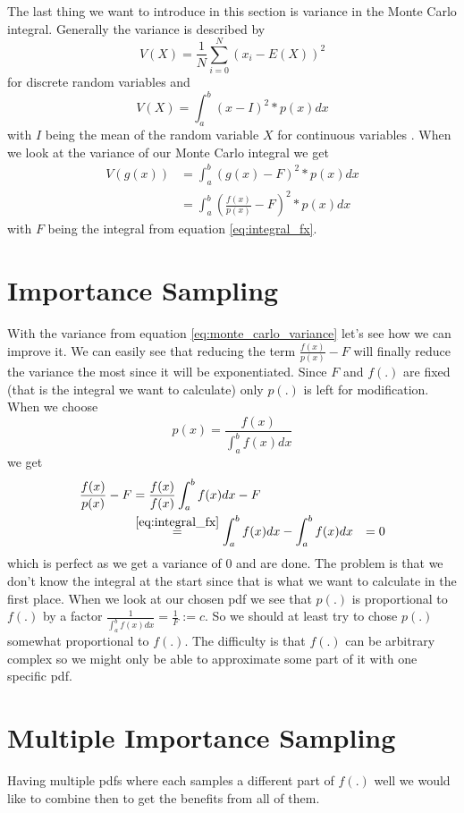 The last thing we want to introduce in this section is variance in the Monte Carlo integral.
Generally the variance is described by $$ V(X) = \frac{1}{N} \sum_{i = 0}^N (x_i - E(X))^2 $$ for discrete random variables \cite{pris}
and $$ V(X) = \int_{a}^b (x - I)^2 * p(x) dx $$ with $ I $ being the mean of the random variable $ X $ for continuous variables \cite{wyzant}.
When we look at the variance of our Monte Carlo integral we get
\begin{equation}
\label{eq:monte_carlo_variance}
\begin{aligned}
    V(g(x)) &= \int_{a}^b (g(x) - F)^2 * p(x) dx \\
            &= \int_{a}^b \left(\frac{f(x)}{p(x)} - F\right)^2 * p(x) dx
\end{aligned}
\end{equation}
with $ F $ being the integral from equation \ref{eq:integral_fx}.


\section{Importance Sampling}
\label{sec:importance_sampling}
With the variance from equation \ref{eq:monte_carlo_variance} let's see how we can improve it.
We can easily see that reducing the term $ \frac{f(x)}{p(x)} - F $ will finally reduce the variance the most since it will be exponentiated.
Since $ F $ and $ f(.) $ are fixed (that is the integral we want to calculate) only $ p(.) $ is left for modification.
When we choose $$ p(x) = \frac{f(x)}{\int_{a}^b f(x) dx} $$ we get
\begin{equation*}
\begin{aligned}
    \frac{f(x)}{p(x)} - F &= \frac{f(x)}{f(x)}\int_{a}^b f(x) dx - F \\
        &\stackrel{\ref{eq:integral_fx}}{=} \int_{a}^b f(x) dx - \int_{a}^b f(x) dx
        &= 0
\end{aligned}
\end{equation*}
which is perfect as we get a variance of 0 and are done.
The problem is that we don't know the integral at the start since that is what we want to calculate in the first place.
When we look at our chosen pdf we see that $ p(.) $ is proportional to $ f(.) $ by a factor $ \frac{1}{\int_{a}^b f(x) dx} = \frac{1}{F} := c $.
So we should at least try to chose $ p(.) $ somewhat proportional to $ f(.) $.
The difficulty is that $ f(.) $ can be arbitrary complex so we might only be able to approximate some part of it with one specific pdf.


\section{Multiple Importance Sampling}
\label{sec:multiple_importance_sampling}
Having multiple pdfs where each samples a different part of $ f(.) $ well
we would like to combine then to get the benefits from all of them.

